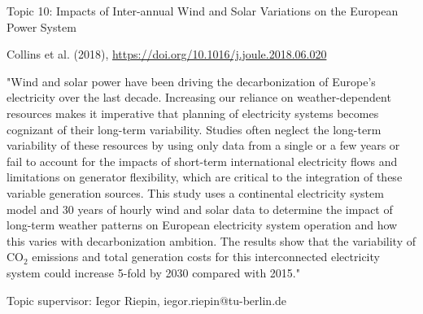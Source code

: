 \documentclass[10pt,aspectratio=169,dvipsnames]{beamer}
\begin{document}
\begin{frame}
  \begin{block}{Topic 10: Impacts of Inter-annual Wind and Solar Variations on the European Power System}
      
     Collins et al. (2018), 
    \href{https://doi.org/10.1016/j.joule.2018.06.020}{https://doi.org/10.1016/j.joule.2018.06.020}
    
    "Wind and solar power have been driving the decarbonization of Europe's electricity over the last decade. Increasing our reliance on weather-dependent resources makes it imperative that planning of electricity systems becomes cognizant of their long-term variability. Studies often neglect the long-term variability of these resources by using only data from a single or a few years or fail to account for the impacts of short-term international electricity flows and limitations on generator flexibility, which are critical to the integration of these variable generation sources. This study uses a continental electricity system model and 30 years of hourly wind and solar data to determine the impact of long-term weather patterns on European electricity system operation and how this varies with decarbonization ambition. The results show that the variability of CO$_2$ emissions and total generation costs for this interconnected electricity system could increase 5-fold by 2030 compared with 2015."

    \hfill
    Topic supervisor:  Iegor Riepin, iegor.riepin@tu-berlin.de
    
  \end{block}
\end{frame}
\end{document}
